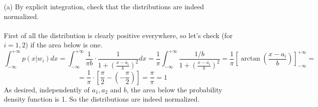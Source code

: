 \documentclass[10pt]{article}
\begin{document}
\begin{enumerate}
\Large
  \item[(a)] By explicit integration, check that the distributions are indeed normalized. \\ \ \\
\normalsize
First of all the distribution is clearly positive everywhere, so let's check (for $i=1,2$) if the area below is one.
$$
\int_{-\infty}^{+\infty} p(x|w_i) dx = \int_{-\infty}^{+\infty} \frac{1}{\pi b} \cdot \frac{1}{1 + \left(\frac{x-a_i}{b}\right)^2} dx = \frac{1}{\pi}\int_{-\infty}^{+\infty}\frac{1/b}{1 + \left(\frac{x-a_i}{b}\right)^2}=\frac{1}{\pi} \left[\arctan\left(\frac{x-a_i}{b}\right)\right]_{-\infty}^{+\infty} =
$$
$$
 =\frac{1}{\pi} \cdot \left[ \frac{\pi}{2} - \left(-\frac{\pi}{2}\right)\right] = \frac{\pi}{\pi} = 1
$$
As desired, independently of $a_1, a_2$ and $b$, the area below the probability density function is 1. So the distributions are indeed normalized.


\end{enumerate}
\end{document}
